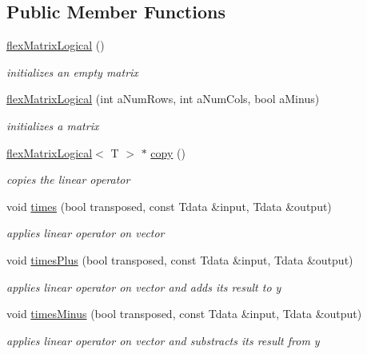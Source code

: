 \subsection*{Public Member Functions}
\begin{DoxyCompactItemize}
\item 
\mbox{\label{classflex_matrix_logical_a638c50a335498ef4f78d76f7304561f6}} 
\hyperlink{classflex_matrix_logical_a638c50a335498ef4f78d76f7304561f6}{flex\+Matrix\+Logical} ()
\begin{DoxyCompactList}\small\item\em initializes an empty matrix \end{DoxyCompactList}\item 
\hyperlink{classflex_matrix_logical_abbd2d5d1be94e9d98167e82b6f0395be}{flex\+Matrix\+Logical} (int a\+Num\+Rows, int a\+Num\+Cols, bool a\+Minus)
\begin{DoxyCompactList}\small\item\em initializes a matrix \end{DoxyCompactList}\item 
\hyperlink{classflex_matrix_logical}{flex\+Matrix\+Logical}$<$ T $>$ $\ast$ \hyperlink{classflex_matrix_logical_a25c9ecc21cfccc07e1390c554784ee27}{copy} ()
\begin{DoxyCompactList}\small\item\em copies the linear operator \end{DoxyCompactList}\item 
void \hyperlink{classflex_matrix_logical_ab1ccf3400da547a27b5753a894905c63}{times} (bool transposed, const Tdata \&input, Tdata \&output)
\begin{DoxyCompactList}\small\item\em applies linear operator on vector \end{DoxyCompactList}\item 
void \hyperlink{classflex_matrix_logical_ad8a018f29237002d79faed523e5e2546}{times\+Plus} (bool transposed, const Tdata \&input, Tdata \&output)
\begin{DoxyCompactList}\small\item\em applies linear operator on vector and adds its result to y \end{DoxyCompactList}\item 
void \hyperlink{classflex_matrix_logical_a7f3b3d9f007696d7140c2f2256de8dd8}{times\+Minus} (bool transposed, const Tdata \&input, Tdata \&output)
\begin{DoxyCompactList}\small\item\em applies linear operator on vector and substracts its result from y \end{DoxyCompactList}\item 

\end{DoxyCompactItemize}
